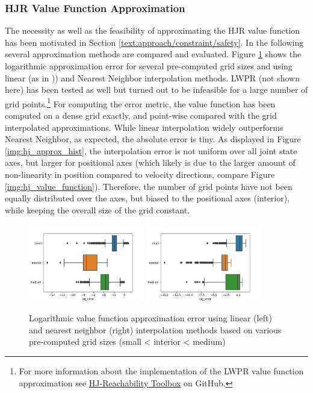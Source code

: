 \subsubsection{HJR Value Function Approximation}
The necessity as well as the feasibility of approximating the \ac{HJR} value function has been motivated in Section \ref{text:approach/constraint/safety}. In the following several approximation methods are compared and evaluated.
\newline 
Figure \ref{img:hj_approx_bar} shows the logarithmic approximation error for several pre-computed grid sizes and using linear (as in \cite{Leung2020})) and Nearest Neighbor interpolation methods. LWPR (not shown here) has been tested as well but turned out to be infeasible for a large number of grid points.\footnote{For more information about the implementation of the LWPR value function approximation see \href{https://github.com/simon-schaefer/HJReachibility}{HJ-Reachability Toolbox} on GitHub.} For computing the error metric, the value function has been computed on a dense grid exactly, and point-wise compared with the grid interpolated approximations. While linear interpolation widely outperforms Nearest Neighbor, as expected, the absolute error is tiny. As displayed in Figure \ref{img:hj_approx_hist}, the interpolation error is not uniform over all joint state axes, but larger for positional axes (which likely is due to the larger amount of non-linearity in position compared to velocity directions, compare Figure \ref{img:hj_value_function}). Therefore, the number of grid points have not been equally distributed over the axes, but biased to the positional axes (interior), while keeping the overall size of the grid constant.

\begin{figure}[!ht]
\begin{center}
\includegraphics[width=0.45\textwidth]{images/hj_bar_linear.png}
\includegraphics[width=0.45\textwidth]{images/hj_bar_nearest.png}
\caption{Logarithmic value function approximation error using linear (left) and nearest neighbor (right) interpolation methods based on various pre-computed grid sizes (small < interior < medium)}
\label{img:hj_approx_bar}
\end{center}
\end{figure}

